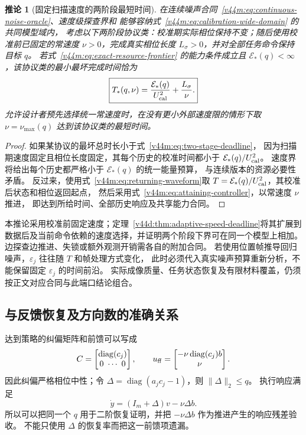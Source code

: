 \documentclass[11pt,a4paper]{article}
\numberwithin{equation}{section}
\newtheorem{corollary}[theorem]{推论}
\theoremstyle{definition}
\begin{document}
\begin{corollary}[固定扫描速度的两阶段最短时间]
\label{v44m:cor:two-stage-deadline}
在连续噪声合同~\eqref{v44m:eq:continuous-noise-oracle}、速度级探查界和
能够容纳式~\eqref{v44m:eq:calibration-wide-domain} 的共同模型域内，
考虑以下两阶段协议类：校准期实际相位保持不变；随后使用校准前已固定的常速度
$\nu>0$，完成真实相位长度 $L_\sigma>0$，并对全部任务命令保持目标 $q$。
若式~\eqref{v44m:eq:exact-resource-frontier} 的能力条件成立且
$\mathcal E_*(q)<\infty$，该协议类的最小最坏完成时间恰为
\begin{equation}
 \boxed{
 T_*(q,\nu)
 =\frac{\mathcal E_*(q)}{U_{\rm cal}^2}
    +\frac{L_\sigma}{\nu}.}
 \label{v44m:eq:two-stage-deadline}
\end{equation}
允许设计者预先选择统一常速度时，在没有更小外部速度限的情形下取
$\nu=\nu_{\max}(q)$ 达到该协议类的最短时间。
\end{corollary}
\begin{proof}
如果某协议的最坏总时长小于式~\eqref{v44m:eq:two-stage-deadline}，
因为扫描期速度固定且相位长度固定，其每个历史的校准时间都小于
$\mathcal E_*(q)/U_{\rm cal}^2$。
速度界将给出每个历史都严格小于 $\mathcal E_*(q)$ 的统一能量预算，
与连续版本的资源必要性矛盾。
反过来，使用式~\eqref{v44m:eq:returning-waveform}取
$T=\mathcal E_*(q)/U_{\rm cal}^2$，其校准后状态和相位返回起点，
然后采用式~\eqref{v44m:eq:attaining-controller}，以常速度 $\nu$ 推进，
即达到所给时间、全部历史响应及共享能力合同。
\end{proof}

本推论采用校准前固定速度；定理~\ref{v44d:thm:adaptive-speed-deadline}将其扩展到数据后及当前命令依赖的速度选择，并证明两个阶段下界可在同一个模型上相加。边探查边推进、失锁或额外观测开销需各自的附加合同。
若使用位置帧推导回归噪声，$\varepsilon_j$ 往往随 $T$ 和帧处理方式变化，
此时必须代入真实噪声预算重新分析，不能保留固定 $\varepsilon_j$ 的时间前沿。
实际成像质量、任务状态恢复及有限材料覆盖，仍须按正文对应合同与此端口结论组合。

\subsection{与反馈恢复及方向数的准确关系}

达到策略的纠偏矩阵和前馈可以写成
\begin{equation}
 C=\begin{bmatrix}\operatorname{diag}(c_j)\\0\ \cdots\ 0\end{bmatrix},
 \qquad
 u_{\rm ff}=
 \begin{bmatrix}-\nu\operatorname{diag}(c_j)b\\\nu\end{bmatrix}.
\end{equation}
因此纠偏严格相位中性；令
$\Delta=\operatorname{diag}(a_jc_j-1)$，则 $\|\Delta\|_2\le q$。
执行响应满足
\begin{equation}
 \dot y=(I_m+\Delta)v-\nu\Delta b.
\end{equation}
所以可以把同一个 $q$ 用于二阶恢复证明，并把
$-\nu\Delta b$ 作为推进产生的响应残差验收。
不能只使用 $\Delta$ 的恢复率而把这一前馈项遗漏。
\end{document}

